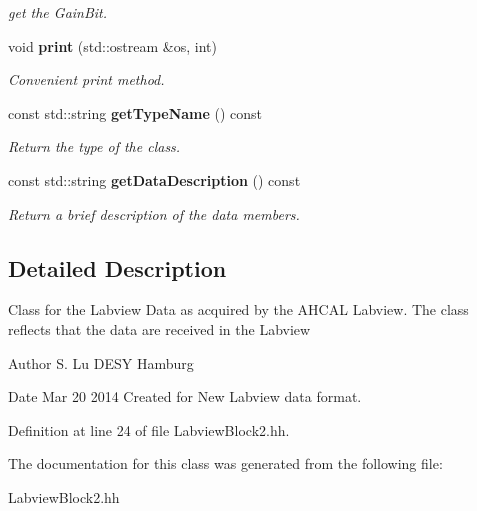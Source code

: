 \begin{DoxyCompactItemize}
\begin{DoxyCompactList}\small\item\em get the GainBit. \item\end{DoxyCompactList}\item 
void {\bf print} (std::ostream \&os, int)\label{classCALICE_1_1LabviewBlock2_a7cb31b570b9ba0054b44af4ef8402158}

\begin{DoxyCompactList}\small\item\em Convenient print method. \item\end{DoxyCompactList}\item 
const std::string {\bf getTypeName} () const \label{classCALICE_1_1LabviewBlock2_a76502d161af6719c26997c8636fc5fa3}

\begin{DoxyCompactList}\small\item\em Return the type of the class. \item\end{DoxyCompactList}\item 
const std::string {\bf getDataDescription} () const \label{classCALICE_1_1LabviewBlock2_aca62c674b9814b65e27baa3b8d11b5dc}

\begin{DoxyCompactList}\small\item\em Return a brief description of the data members. \item\end{DoxyCompactList}\end{DoxyCompactItemize}


\subsection{Detailed Description}
Class for the Labview Data as acquired by the AHCAL Labview. The class reflects that the data are received in the Labview \begin{DoxyAuthor}{Author}
S. Lu DESY Hamburg 
\end{DoxyAuthor}
\begin{DoxyDate}{Date}
Mar 20 2014 Created for New Labview data format. 
\end{DoxyDate}


Definition at line 24 of file LabviewBlock2.hh.

The documentation for this class was generated from the following file:\begin{DoxyCompactItemize}
\item 
LabviewBlock2.hh\end{DoxyCompactItemize}
